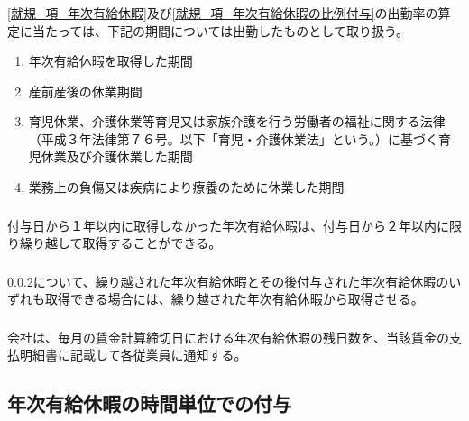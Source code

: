 \documentclass{jsarticle}
\begin{document}
\subsubsection{}
\label{就規_項_年次有給休暇の出勤率算定}
\ref{就規_項_年次有給休暇}及び\ref{就規_項_年次有給休暇の比例付与}の出勤率の算定に当たっては、下記の期間については出勤したものとして取り扱う。
  \begin{enumerate}
    \item 年次有給休暇を取得した期間
    \item 産前産後の休業期間
    \item 育児休業、介護休業等育児又は家族介護を行う労働者の福祉に関する法律（平成３年法律第７６号。以下「育児・介護休業法」という。）に基づく育児休業及び介護休業した期間
    \item 業務上の負傷又は疾病により療養のために休業した期間
  \end{enumerate}
\subsubsection{}
\label{就規_項_年次有給休暇の繰越}
付与日から１年以内に取得しなかった年次有給休暇は、付与日から２年以内に限り繰り越して取得することができる。
\subsubsection{}
\label{就規_項_繰越分年次有給休暇の消費}
\ref{就規_項_年次有給休暇の繰越}について、繰り越された年次有給休暇とその後付与された年次有給休暇のいずれも取得できる場合には、繰り越された年次有給休暇から取得させる。
\subsubsection{}
\label{就規_項_年次有給休暇の残数通知}
会社は、毎月の賃金計算締切日における年次有給休暇の残日数を、当該賃金の支払明細書に記載して各従業員に通知する。

\subsection{年次有給休暇の時間単位での付与}
\label{就規_条_年次有給休暇の時間単位での付与}
\end{document}
